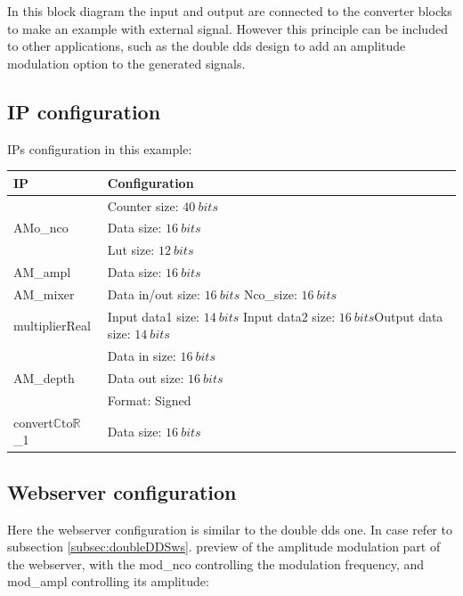 \documentclass[12pt,oneside]{article}
\begin{document}
In this block diagram the input and output are connected to the converter blocks to make an example with external signal. However this principle can be included to other applications, such as the double dds design to add an amplitude modulation option to the generated signals.
\vspace{-0.3cm}
\subsection{IP configuration}
\vspace{-0cm}
IPs configuration in this example:
\begin{center}
	\begin{tabular}{|>{\centering\arraybackslash}m{.3\linewidth} | >{\centering\arraybackslash}m{.3\linewidth} |}
		\hline
		IP & Configuration \\
		\hline
		& Counter size: $40~bits$\\ AMo\_nco &Data size: $16~bits$\\ &Lut size: $12~bits$ \\
		\hline
		AM\_ampl&Data size: $16~bits$ \\
		\hline
		AM\_mixer&Data in/out size: $16~bits$ \newline Nco\_size: $16~bits$ \\
		\hdashline
		multiplierReal&Input data1 size: $14~bits$ \newline Input data2 size: $16~bits$\newline Output data size: $14~bits$ \\
		\hline
		& Data in size: $16~bits$\\AM\_depth & Data out size: $16~bits$\\ &Format: Signed \\
		\hline
		convert$\mathbb{C}$to$\mathbb{R}$\_1&Data size: $16~bits$\\
		\hline
	\end{tabular}
\end{center}
\vspace{-0.2cm}
\subsection{Webserver configuration}

Here the webserver configuration is similar to the double dds one. In case refer to subsection \ref{subsec:doubleDDSws}. preview of the amplitude modulation part of the webserver, with the mod\_nco controlling the modulation frequency, and mod\_ampl controlling its amplitude:
\end{document}
